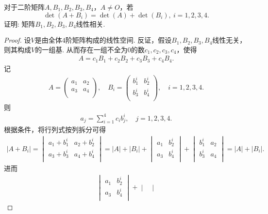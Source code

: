 \documentclass[../../main.tex]{subfiles}
\begin{document}
\begin{example}
对于二阶矩阵$A,B_1,B_2,B_3,B_4$，$A \neq O$，若
$$\det(A + B_i) = \det(A) + \det(B_i),\ i = 1,2,3,4.$$
证明: 矩阵$B_1,B_2,B_3,B_4$线性相关.
\end{example}
\begin{proof}
设$V$是由全体$4$阶矩阵构成的线性空间. 反证，假设$B_1,B_2,B_3,B_4$线性无关，则其构成$V$的一组基. 从而存在一组不全为$0$的数$c_1,c_2,c_3,c_4$，使得
\begin{align*}
A=c_1B_1+c_2B_2+c_3B_3+c_4B_4.
\end{align*}
记
\begin{align*}
A=\begin{pmatrix}
a_1&		a_2\\
a_3&		a_4\\
\end{pmatrix},\quad B_i=\begin{pmatrix}
b_{1}^{i}&		b_{2}^{i}\\
b_{3}^{i}&		b_{4}^{i}\\
\end{pmatrix},\quad i=1,2,3,4.
\end{align*}
则
\begin{align*}
a_j=\sum_{i=1}^4{c_ib_{j}^{i}},\quad j=1,2,3,4.
\end{align*}
根据条件，将行列式按列拆分可得
\begin{align*}
\left| A+B_i \right|=\begin{vmatrix}
a_1+b_{1}^{i}&		a_2+b_{2}^{i}\\
a_3+b_{3}^{i}&		a_4+b_{4}^{i}\\
\end{vmatrix}=\left| A \right|+\left| B_i \right|+\begin{vmatrix}
a_1&		b_{2}^{i}\\
a_3&		b_{4}^{i}\\
\end{vmatrix}+\begin{vmatrix}
b_{1}^{i}&		a_2\\
b_{3}^{i}&		a_4\\
\end{vmatrix}=\left| A \right|+\left| B_i \right|.
\end{align*}
进而
\begin{align*}
\begin{vmatrix}
a_1&		b_{2}^{i}\\
a_3&		b_{4}^{i}\\
\end{vmatrix}+\begin{vmatrix}

\end{vmatrix}
\end{align*}
\end{proof}
\end{document}
